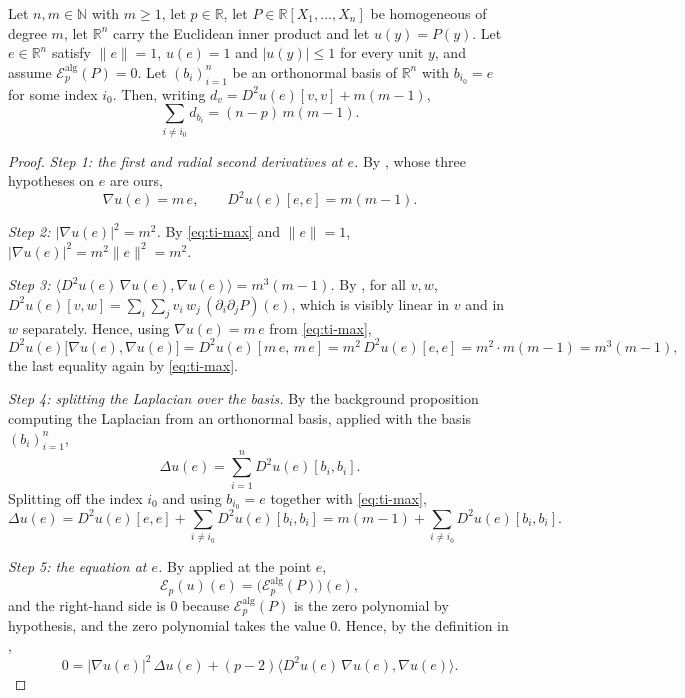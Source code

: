 \begin{lemma}
Let $n,m\in\mathbb{N}$ with $m\ge1$, let $p\in\mathbb{R}$, let
$P\in\mathbb{R}[X_1,\dots,X_n]$ be homogeneous of degree $m$, let $\mathbb{R}^n$
carry the Euclidean inner product and let $u(y)=P(y)$. Let $e\in\mathbb{R}^n$
satisfy $\lVert e\rVert=1$, $u(e)=1$ and $\lvert u(y)\rvert\le1$ for every unit
$y$, and assume $\mathcal{E}^{\mathrm{alg}}_p(P)=0$. Let $(b_i)_{i=1}^{n}$ be an
orthonormal basis of $\mathbb{R}^n$ with $b_{i_0}=e$ for some index $i_0$. Then,
writing $d_v=D^2u(e)[v,v]+m(m-1)$,
\[
  \sum_{i\ne i_0}d_{b_i}=(n-p)\,m(m-1).
\]
\end{lemma}
\begin{proof}
\emph{Step 1: the first and radial second derivatives at $e$.} By
, whose three hypotheses on $e$ are ours,
\begin{equation}\label{eq:ti-max}
  \nabla u(e)=m\,e,
  \qquad
  D^2u(e)[e,e]=m(m-1).
\end{equation}

\emph{Step 2: $\lvert\nabla u(e)\rvert^2=m^2$.} By \eqref{eq:ti-max} and
$\lVert e\rVert=1$, $\lvert\nabla u(e)\rvert^2=m^2\lVert e\rVert^2=m^2$.

\emph{Step 3: $\langle D^2u(e)\,\nabla u(e),\nabla u(e)\rangle=m^3(m-1)$.} By
, for all $v,w$,
$D^2u(e)[v,w]=\sum_i\sum_j v_i\,w_j\,(\partial_i\partial_jP)(e)$, which is
visibly linear in $v$ and in $w$ separately. Hence, using
$\nabla u(e)=m\,e$ from \eqref{eq:ti-max},
\[
  D^2u(e)\bigl[\nabla u(e),\nabla u(e)\bigr]
  =D^2u(e)[m\,e,\,m\,e]=m^2\,D^2u(e)[e,e]=m^2\cdot m(m-1)=m^3(m-1),
\]
the last equality again by \eqref{eq:ti-max}.

\emph{Step 4: splitting the Laplacian over the basis.} By the background
proposition computing the Laplacian from an orthonormal basis, applied with the
basis $(b_i)_{i=1}^{n}$,
\[
  \Delta u(e)=\sum_{i=1}^{n}D^2u(e)[b_i,b_i].
\]
Splitting off the index $i_0$ and using $b_{i_0}=e$ together with
\eqref{eq:ti-max},
\begin{equation}\label{eq:ti-lap}
  \Delta u(e)=D^2u(e)[e,e]+\sum_{i\ne i_0}D^2u(e)[b_i,b_i]
  =m(m-1)+\sum_{i\ne i_0}D^2u(e)[b_i,b_i].
\end{equation}

\emph{Step 5: the equation at $e$.} By  applied at the
point $e$,
\[
  \mathcal{E}_p(u)(e)=\bigl(\mathcal{E}^{\mathrm{alg}}_p(P)\bigr)(e),
\]
and the right-hand side is $0$ because $\mathcal{E}^{\mathrm{alg}}_p(P)$ is the
zero polynomial by hypothesis, and the zero polynomial takes the value $0$.
Hence, by the definition in ,
\begin{equation}\label{eq:ti-eq}
  0=\lvert\nabla u(e)\rvert^2\,\Delta u(e)
    +(p-2)\bigl\langle D^2u(e)\,\nabla u(e),\nabla u(e)\bigr\rangle .
\end{equation}


\end{proof}
